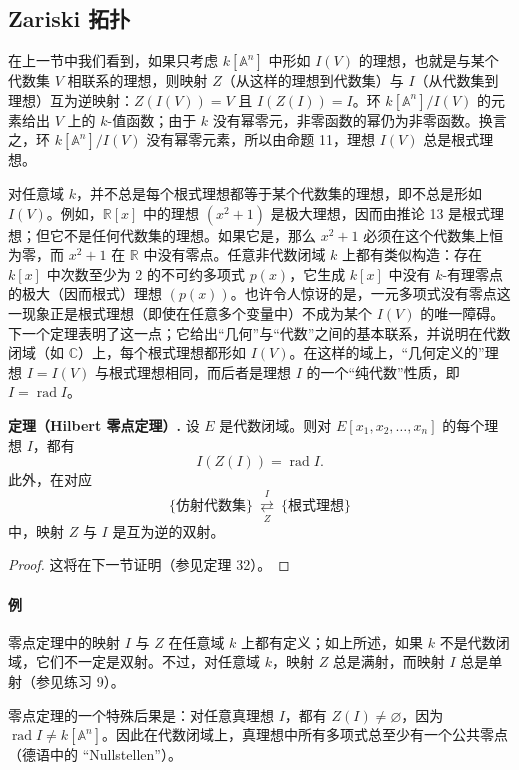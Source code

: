 \subsection*{Zariski 拓扑}

在上一节中我们看到，如果只考虑 $k[\mathbb A^n]$ 中形如 $I(V)$ 的理想，也就是与某个代数集 $V$ 相联系的理想，则映射 $Z$（从这样的理想到代数集）与 $I$（从代数集到理想）互为逆映射：$Z(I(V))=V$ 且 $I(Z(I))=I$。环 $k[\mathbb A^n]/I(V)$ 的元素给出 $V$ 上的 $k$-值函数；由于 $k$ 没有幂零元，非零函数的幂仍为非零函数。换言之，环 $k[\mathbb A^n]/I(V)$ 没有幂零元素，所以由命题 11，理想 $I(V)$ 总是根式理想。

对任意域 $k$，并不总是每个根式理想都等于某个代数集的理想，即不总是形如 $I(V)$。例如，$\mathbb R[x]$ 中的理想 $(x^2+1)$ 是极大理想，因而由推论 13 是根式理想；但它不是任何代数集的理想。如果它是，那么 $x^2+1$ 必须在这个代数集上恒为零，而 $x^2+1$ 在 $\mathbb R$ 中没有零点。任意非代数闭域 $k$ 上都有类似构造：存在 $k[x]$ 中次数至少为 $2$ 的不可约多项式 $p(x)$，它生成 $k[x]$ 中没有 $k$-有理零点的极大（因而根式）理想 $(p(x))$。也许令人惊讶的是，一元多项式没有零点这一现象正是根式理想（即使在任意多个变量中）不成为某个 $I(V)$ 的唯一障碍。下一个定理表明了这一点；它给出“几何”与“代数”之间的基本联系，并说明在代数闭域（如 $\mathbb C$）上，每个根式理想都形如 $I(V)$。在这样的域上，“几何定义的”理想 $I=I(V)$ 与根式理想相同，而后者是理想 $I$ 的一个“纯代数”性质，即 $I=\operatorname{rad}I$。

\noindent\textbf{定理（Hilbert 零点定理）.} 设 $E$ 是代数闭域。则对 $E[x_1,x_2,\ldots,x_n]$ 的每个理想 $I$，都有
\[
I(Z(I))=\operatorname{rad}I.
\]
此外，在对应
\[
\{\text{仿射代数集}\}\ \underset{Z}{\stackrel{I}{\rightleftarrows}}\ \{\text{根式理想}\}
\]
中，映射 $Z$ 与 $I$ 是互为逆的双射。

\begin{proof}
	这将在下一节证明（参见定理 32）。
\end{proof}

\paragraph{例}
零点定理中的映射 $I$ 与 $Z$ 在任意域 $k$ 上都有定义；如上所述，如果 $k$ 不是代数闭域，它们不一定是双射。不过，对任意域 $k$，映射 $Z$ 总是满射，而映射 $I$ 总是单射（参见练习 9）。

零点定理的一个特殊后果是：对任意真理想 $I$，都有 $Z(I)\ne\varnothing$，因为 $\operatorname{rad}I\ne k[\mathbb A^n]$。因此在代数闭域上，真理想中所有多项式总至少有一个公共零点（德语中的 ``Nullstellen''）。

